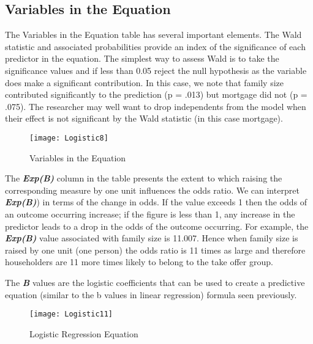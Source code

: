 \documentclass[a4paper,12pt]{article}
\begin{document}
\subsection{Variables in the Equation}
The Variables in the Equation table has several important elements. The Wald statistic and associated probabilities provide an index of the significance of each predictor in the equation.
The simplest way to assess Wald is to take the significance values and if less
than 0.05 reject the null hypothesis as the variable does make a significant contribution.
In this case, we note that family size contributed significantly to the prediction
(p = .013) but mortgage did not (p = .075). The researcher may well want to drop
independents from the model when their effect is not significant by the Wald statistic
(in this case mortgage).

\begin{figure}
\begin{center}
  \texttt{[image: Logistic8]}\\
  \caption{Variables in the Equation}
\end{center}
\end{figure}

The \textbf{\textit{Exp(B)}} column in the table presents the extent to which raising the corresponding measure by one unit influences the odds ratio. We can interpret \textbf{\textit{Exp(B)}}) in
terms of the change in odds. If the value exceeds 1 then the odds of an outcome occurring increase; if the figure is less than 1, any increase in the predictor leads to a drop in
the odds of the outcome occurring. For example, the \textbf{\textit{Exp(B)}} value associated with
family size is 11.007. Hence when family size is raised by one unit (one person) the
odds ratio is 11 times as large and therefore householders are 11 more times likely to
belong to the take offer group.

The \textbf{\textit{B}} values are the logistic coefficients that can be used to create a predictive
equation (similar to the b values in linear regression) formula seen previously.
\begin{figure}
\begin{center}
  \texttt{[image: Logistic11]}\\
  \caption{Logistic Regression Equation}
\end{center}
\end{figure}
\end{document}
